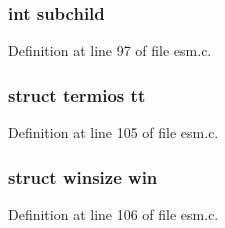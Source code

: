 \subsubsection{\setlength{\rightskip}{0pt plus 5cm}int {\bf subchild}}\label{esm_8c_a26}




Definition at line 97 of file esm.c.
\subsubsection{\setlength{\rightskip}{0pt plus 5cm}struct termios {\bf tt}}\label{esm_8c_a31}




Definition at line 105 of file esm.c.
\subsubsection{\setlength{\rightskip}{0pt plus 5cm}struct winsize {\bf win}}\label{esm_8c_a32}




Definition at line 106 of file esm.c.